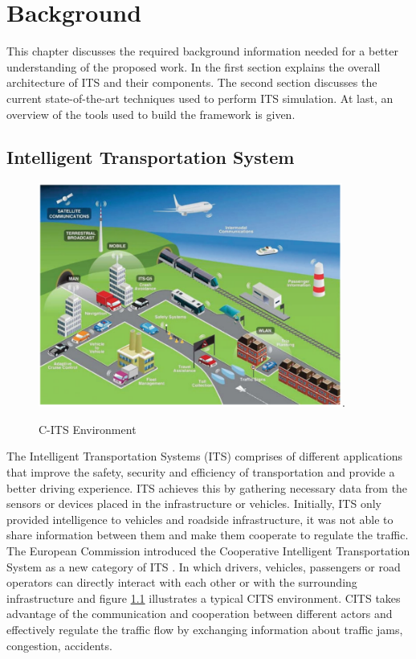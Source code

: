 \chapter{Background}
    This chapter discusses the required background information needed for a better understanding of the proposed work. In the first section explains the overall architecture of ITS and their components. The second section discusses the current state-of-the-art techniques used to perform ITS simulation. At last, an overview of the tools used to build the framework is given.
\section{Intelligent Transportation System}
\begin{figure}[h!]
    \centering
    
    \includegraphics[width=10cm]{Framework/Images/CITS.png}.
    \caption{C-ITS Environment \cite{etsiDENM}}
    \label{cits}
\end{figure}

The Intelligent Transportation Systems (ITS) comprises of different applications that improve the safety, security and efficiency of transportation and provide a better driving experience. ITS achieves this by gathering necessary data from the sensors or devices placed in the infrastructure or vehicles. Initially, ITS only provided intelligence to vehicles  and roadside infrastructure, it was not able to share information between them and make them cooperate to regulate the traffic. 
The European Commission introduced the Cooperative Intelligent Transportation System as a new category of ITS \cite{alam_ferreira_fonseca_2016}. In which drivers, vehicles, passengers or road operators can directly interact with each other or with the surrounding infrastructure and figure \ref{cits} illustrates a typical CITS environment. CITS takes advantage of the communication and cooperation between different actors and effectively regulate the traffic flow by exchanging information about traffic jams, congestion, accidents. 

